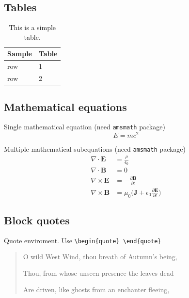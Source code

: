 \documentclass[draft]{emory}
\begin{document}
\subsection{Tables}

\begin{table}[htp!]
  \centering
  \caption{This is a simple table. \label{table}}
  \begin{tabular}{l l}
    \hline
    Sample & Table \\
    \hline 
    row & 1 \\
    row & 2 \\
    \hline
  \end{tabular}
\end{table}

\subsection{Mathematical equations}
Single mathematical equation (need \Verb|amsmath| package)
\begin{equation}
  E = mc^2 \label{math:single}
\end{equation}

Multiple mathematical subequations (need \Verb|amsmath| package)
\begin{subequations}\label{math:sub}
\begin{align}
  \nabla\cdot\pmb{E}&=\frac{\rho}{\epsilon_0} \label{math:sub1}\\
  \nabla\cdot\pmb{B}&=0 \label{math:sub2} \\
  \nabla\times\pmb{E}&=-\frac{\partial\pmb{B}}{\partial t} \label{math:sub3}\\
  \nabla\times\pmb{B}&=\mu_0\Big(\pmb{J}+\epsilon_0\frac{\partial\pmb{E}}{\partial t}\Big) \label{math:sub4}
\end{align}
\end{subequations}

\subsection{Block quotes}
Quote enviroment. Use \Verb|\begin{quote} \end{quote}|

\begin{quote}\label{poet}
O wild West Wind, thou breath of Autumn's being,

Thou, from whose unseen presence the leaves dead

Are driven, like ghosts from an enchanter fleeing,
\end{quote}
\end{document}
